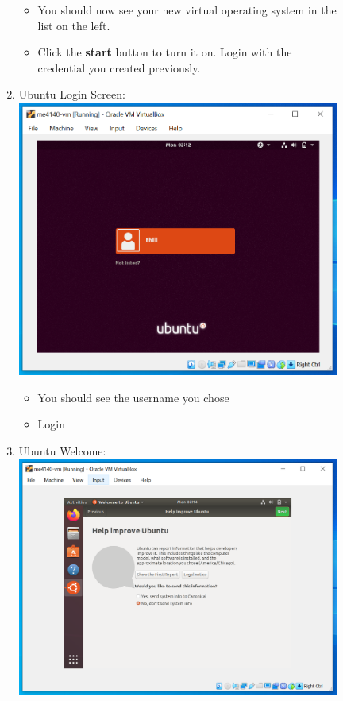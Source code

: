 \documentclass[12pt]{article}
\begin{document}
\begin{description}
\begin{description}
\begin{enumerate}[label=\alph*)]
      		 \begin{itemize}
        	\item You should now see your new virtual operating system in the list on the left. 
        	\item Click the {\bf start} button to turn it on. Login with the credential you created previously.
    		\end{itemize} 
    	
    	\newpage
    		\item Ubuntu Login Screen: \vspace{5mm} \\
      		\includegraphics[scale=.55]{Capture23.png}
      		 \begin{itemize}
        	\item You should see the username you chose 
        	\item Login
    		\end{itemize} 
    		 \vspace{5mm} 
    		\item Ubuntu Welcome: \vspace{5mm} \\
      		\includegraphics[scale=.55]{Capture24.png}

\end{enumerate}
\end{description}
\end{description}
\end{document}
